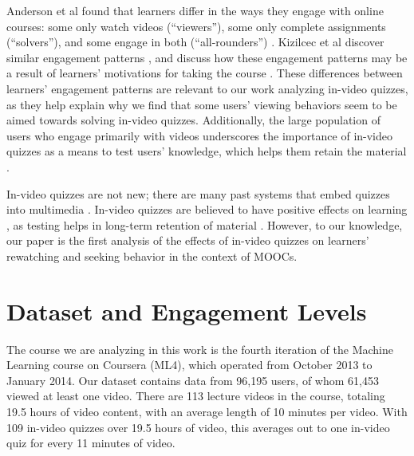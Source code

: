 \documentclass{sigchi}
\begin{document}

Anderson et al found that learners differ in the ways they engage with online courses: some only watch videos (``viewers''), some only complete assignments (``solvers''), and some engage in both (``all-rounders'') \cite{ashton}. Kizilcec et al discover similar engagement patterns \cite{renedisengagement}, and discuss how these engagement patterns may be a result of learners' motivations for taking the course \cite{renemotivation}. These differences between learners' engagement patterns are relevant to our work analyzing in-video quizzes, as they help explain why we find that some users' viewing behaviors seem to be aimed towards solving in-video quizzes. Additionally, the large population of users who engage primarily with videos underscores the importance of in-video quizzes as a means to test users' knowledge, which helps them retain the material \cite{testingeffect}. %


In-video quizzes are not new; there are many past systems that embed quizzes into multimedia \cite{multimedia}. In-video quizzes are believed to have positive effects on learning \cite{embedded}, as testing helps in long-term retention of material \cite{testingeffect}. However, to our knowledge, our paper is the first analysis of the effects of in-video quizzes on learners' rewatching and seeking behavior in the context of MOOCs.

\section{Dataset and Engagement Levels}

The course we are analyzing in this work is the fourth iteration of the Machine Learning course on Coursera (ML4), which operated from October 2013 to January 2014. Our dataset contains data from 96,195 users, of whom 61,453 viewed at least one video. There are 113 lecture videos in the course, totaling 19.5 hours of video content, with an average length of 10 minutes per video. With 109  in-video quizzes over 19.5 hours of video, this averages out to one in-video quiz for every 11 minutes of video.
\end{document}
